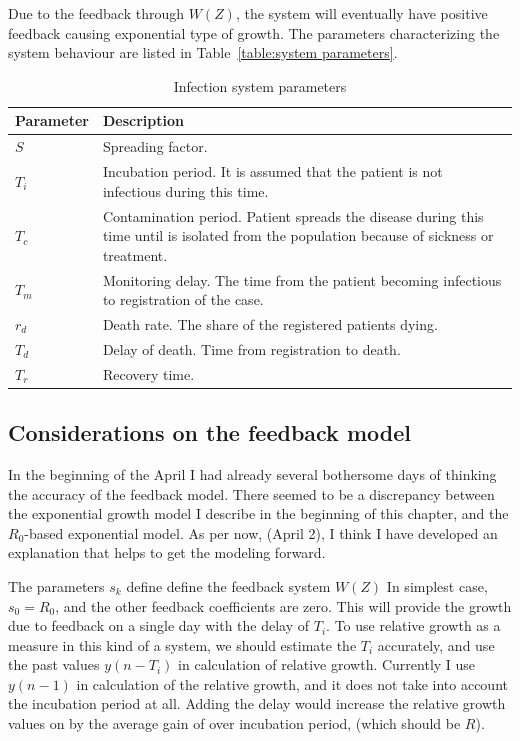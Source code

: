 Due to the feedback through $W(Z)$, the system will eventually have positive
feedback causing exponential type of growth. The parameters characterizing the
system behaviour are listed in Table~\ref{table:system parameters}.
\begin{table}
    \centering
    \caption{Infection system parameters}\label{table:system parameters}
    \begin{tabular}{l|p{10cm}}
        \textbf{Parameter} & \textbf{Description} \\
        \hline
        $S$ & Spreading factor.\\
        $T_i$ & Incubation period. It is assumed that the patient is not
        infectious during this time. \\
        $T_c$ & Contamination period. Patient spreads the disease during this
        time until is isolated from the population because of sickness or
        treatment.\\
        $T_m$ & Monitoring delay. The time from the patient becoming
        infectious to registration of the case.\\
        $r_d$ & Death rate. The share of the registered patients dying.\\
        $T_d$ & Delay of death. Time from registration to death.\\
        $T_r$ & Recovery time.
    \end{tabular}
    \label{tab:system_parameters}
\end{table}

\subsection{Considerations on the feedback model}
In the beginning of the  April I had already several bothersome days of
thinking the accuracy of the  feedback model. There seemed to be a
discrepancy between the exponential growth model I describe in the beginning
of this chapter, and the $R_0$-based exponential model. As per now, (April 2), I
think I have developed an explanation that helps to get the modeling forward.

The parameters $s_k$ define define the feedback system $W(Z)$ In simplest case,
$s_0=R_0$, and the other feedback coefficients are zero. This will provide
the growth due to feedback on a single day with the delay of $T_i$. To use
relative growth as a measure in this kind of a system, we should estimate the
$T_i$ accurately, and use the past values $y\left(n-T_i\right)$ in calculation
of relative growth. Currently I use $y\left(n-1\right)$ in calculation of the
relative growth, and it does not take into account the incubation period at
all. Adding the delay would increase the relative growth values on by the
average gain of over incubation period, (which should be $R$). 

